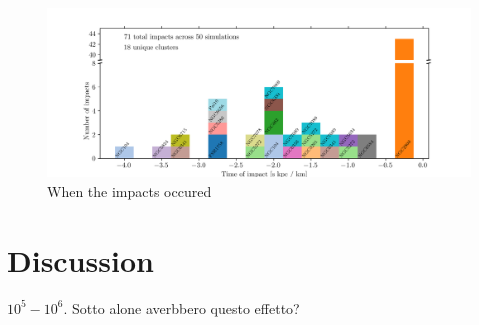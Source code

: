 \documentclass[draft]{aa}
\begin{document}
  \begin{figure}
    \centering
    \includegraphics[width=\linewidth]{histogram_impact_time.png}
    \caption{When the impacts occured}
    \label{fig:histogram_impact_time}
    \end{figure}
  


  \section{Discussion}
    $10^5-10^6$. Sotto alone averbbero questo effetto? 





\end{document}
